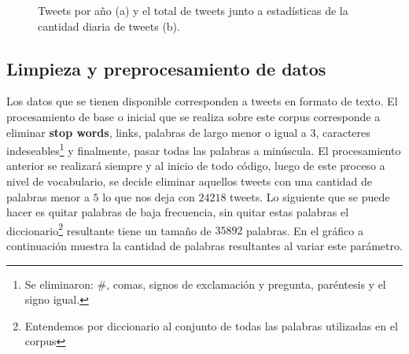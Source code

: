 \documentclass{article}
\begin{document}
	
 	\begin{figure}[H]
 		\centering

 		\caption{Tweets por año (a) y el total de tweets junto a estadísticas de la cantidad diaria de tweets (b).}
 	\end{figure}
	
\subsection{Limpieza y preprocesamiento de datos}
	Los datos que se tienen disponible corresponden a tweets en formato de texto. El procesamiento de base o inicial que se realiza sobre este corpus corresponde a eliminar \textbf{stop words}, links, palabras de largo menor o igual a $3$, caracteres indeseables\footnote{Se eliminaron: \#, comas, signos de exclamación y pregunta, paréntesis y el signo igual.} y finalmente, pasar todas las palabras a minúscula. El procesamiento anterior se realizará siempre y al inicio de todo código, luego de este proceso a nivel de vocabulario, se decide eliminar aquellos tweets con una cantidad de palabras menor a $5$ lo que nos deja con $24218$ tweets. Lo siguiente que se puede hacer es quitar palabras de baja frecuencia, sin quitar estas palabras el diccionario\footnote{Entendemos por diccionario al conjunto de todas las palabras utilizadas en el corpus} resultante tiene un tamaño de $35892$ palabras. En el gráfico a continuación muestra la cantidad de palabras resultantes al variar este parámetro.
	
\end{document}
